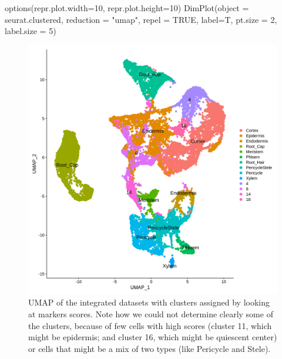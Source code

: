 \documentclass[
  letterpaper,
  DIV=11,
  numbers=noendperiod]{scrartcl}
\newenvironment{Shaded}{\begin{snugshade}}{\end{snugshade}}
\newcommand{\AttributeTok}[1]{\textcolor[rgb]{0.49,0.56,0.16}{#1}}
\newcommand{\ConstantTok}[1]{\textcolor[rgb]{0.53,0.00,0.00}{#1}}
\newcommand{\DecValTok}[1]{\textcolor[rgb]{0.25,0.63,0.44}{#1}}
\newcommand{\FunctionTok}[1]{\textcolor[rgb]{0.02,0.16,0.49}{#1}}
\newcommand{\NormalTok}[1]{\textcolor[rgb]{0.00,0.44,0.13}{#1}}
\newcommand{\StringTok}[1]{\textcolor[rgb]{0.25,0.44,0.63}{#1}}
\begin{document}
\begin{Shaded}
\begin{Highlighting}[]
\FunctionTok{options}\NormalTok{(}\AttributeTok{repr.plot.width=}\DecValTok{10}\NormalTok{, }\AttributeTok{repr.plot.height=}\DecValTok{10}\NormalTok{)}
\FunctionTok{DimPlot}\NormalTok{(}\AttributeTok{object =}\NormalTok{ seurat.clustered, }\AttributeTok{reduction =} \StringTok{"umap"}\NormalTok{, }\AttributeTok{repel =} \ConstantTok{TRUE}\NormalTok{, }\AttributeTok{label=}\NormalTok{T, }\AttributeTok{pt.size =} \DecValTok{2}\NormalTok{, }\AttributeTok{label.size =} \DecValTok{5}\NormalTok{)}
\end{Highlighting}
\end{Shaded}

\begin{figure}[H]

{\centering \includegraphics{notebook_files/figure-pdf/fig-umapbyeye-output-1.png}

}

\caption{\label{fig-umapbyeye}UMAP of the integrated datasets with
clusters assigned by looking at markers scores. Note how we could not
determine clearly some of the clusters, because of few cells with high
scores (cluster 11, which might be epidermis; and cluster 16, which
might be quiescent center) or cells that might be a mix of two types
(like Pericycle and Stele).}

\end{figure}
\end{document}
